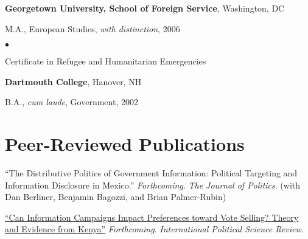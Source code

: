 \documentclass[margin,line]{res}
\newenvironment{list1}{
  \begin{list}{\ding{113}}{%
      \setlength{\itemsep}{0in}
      \setlength{\parsep}{0in} \setlength{\parskip}{0in}
      \setlength{\topsep}{0in} \setlength{\partopsep}{0in} 
      \setlength{\leftmargin}{0.17in}}}{\end{list}}
\newenvironment{list2}{
  \begin{list}{$\bullet$}{%
      \setlength{\itemsep}{0in}
      \setlength{\parsep}{0in} \setlength{\parskip}{0in}
      \setlength{\topsep}{0in} \setlength{\partopsep}{0in} 
      \setlength{\leftmargin}{0.2in}}}{\end{list}}
\begin{document}
{\begin{resume}
{\bf Georgetown University, School of Foreign Service}, Washington, DC 
\begin{list1}
\item[] M.A., European Studies, \emph{with distinction},  2006
  \begin{list2}
\item[] Certificate in Refugee and Humanitarian Emergencies

\end{list2}
\end{list1}

{\bf Dartmouth College}, Hanover, NH
\begin{list1}
\item[] B.A., \emph{cum laude}, Government,  2002
\end{list1}



\section{\sc Peer-Reviewed Publications}
\renewcommand{\labelenumi}{\theenumi.}
\begin{etaremune}

\item ``The Distributive Politics of Government Information: Political
  Targeting and Information Disclosure in Mexico.'' \emph{Forthcoming}.
  \emph{The Journal of Politics}. (with Dan Berliner, Benjamin Bagozzi,
and Brian Palmer-Rubin)
  
 \item  \href{https://doi.org/10.1177/0192512119836283}{``Can Information Campaigns Impact Preferences toward Vote
   Selling? Theory and Evidence from Kenya''}
   \emph{Forthcoming}. \emph{International Political Science Review}.
   

\end{etaremune}
\end{resume}}
\end{document}
